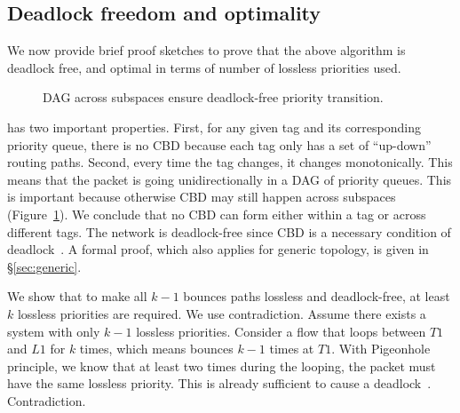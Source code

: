 \subsection {Deadlock freedom and optimality}
\label{subsec:specific_deadlock_free}

We now provide brief proof sketches to prove that the above algorithm is
deadlock free, and optimal in terms of number of lossless priorities used.

\begin{figure}[t]
	\centering
	
	
	\caption{DAG across subspaces ensure deadlock-free priority transition.}\label{fig:subspace}
\end{figure}

 \sysname{} has two
important properties. First, for any given tag and its corresponding priority
queue, there is no CBD because each tag only has a set of ``up-down'' routing
paths.  Second, every time the tag changes, it changes monotonically. This means
that the packet is going unidirectionally in a DAG of priority queues. This is
important because otherwise CBD may still happen across subspaces
(Figure~\ref{fig:subspace}).  We conclude that no CBD can form either within a
tag or across different tags.  The network is deadlock-free since CBD is a
necessary condition of deadlock~\cite{our_hotnets_paper}.  A formal proof, which
also applies for generic topology, is given in \S\ref{sec:generic}.

 We show that
to make all $k-1$ bounces paths lossless and deadlock-free, at least $k$
lossless priorities are required. We use contradiction.  Assume there exists a
system with only $k-1$ lossless priorities. Consider a flow that loops between
$T1$ and $L1$ for $k$ times, which means bounces $k-1$ times at $T1$. With
Pigeonhole principle, we know that at least two times during the looping, the
packet must have the same lossless priority. This is already sufficient to cause
a deadlock~\cite{our_hotnets_paper}. Contradiction.

